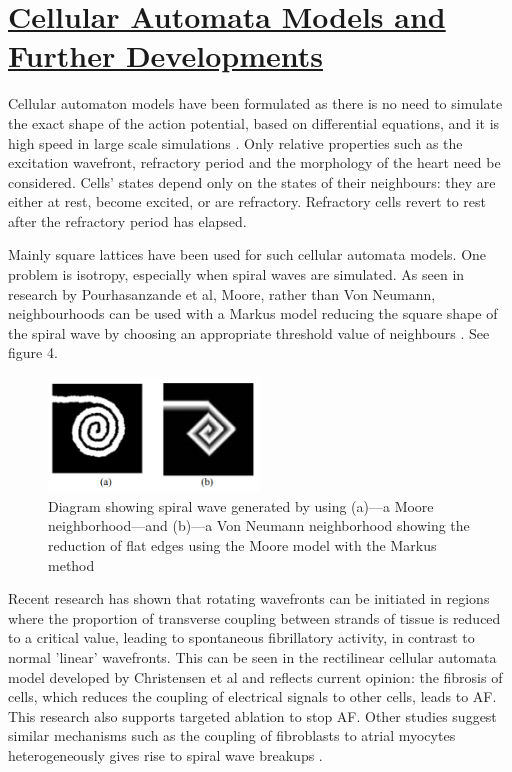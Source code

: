 \documentclass[twocolumn]{article}
\begin{document}
\section{\textbf{\underline{Cellular Automata Models and}\\ \underline{Further Developments}}}



Cellular automaton models have been formulated as there is no need to simulate the exact shape of the action potential, based on differential equations, and it is high speed in large scale simulations \cite{Felipe}. Only relative properties such as the excitation wavefront, refractory period and the morphology of the heart need be considered. Cells' states depend only on the states of their neighbours: they are either at rest, become excited, or are refractory. Refractory cells revert to rest after the refractory period has elapsed.


Mainly square lattices have been used for such cellular automata models. One problem is isotropy, especially when spiral waves are simulated. As seen in research by Pourhasanzande et al, Moore, rather than Von Neumann, neighbourhoods can be used with a Markus model reducing the square shape of the spiral wave by choosing an appropriate threshold value of neighbours \cite{Pour}. See figure 4.


\begin{figure}
\caption[short title]{Diagram showing spiral wave generated by using (a)---a Moore neighborhood---and (b)---a Von
Neumann neighborhood showing the reduction of flat edges using the Moore model with the Markus method
 \cite{Pour}}
\centering
\includegraphics[width = 0.5\textwidth]{flatedgered}
\end{figure}

Recent research has shown that rotating wavefronts can be initiated in regions where the proportion of transverse coupling between strands of tissue is reduced to a critical value, leading to spontaneous fibrillatory activity, in contrast to normal 'linear' wavefronts. This can be seen in the rectilinear cellular automata model developed by Christensen et al and reflects current opinion: the fibrosis of cells, which reduces the coupling of electrical signals to other cells, leads to AF\cite{Christensen}. This research also supports targeted ablation to stop AF. Other studies suggest similar mechanisms such as the coupling of fibroblasts to atrial myocytes heterogeneously gives rise to spiral wave breakups \cite{Ozawa}.
\end{document}
